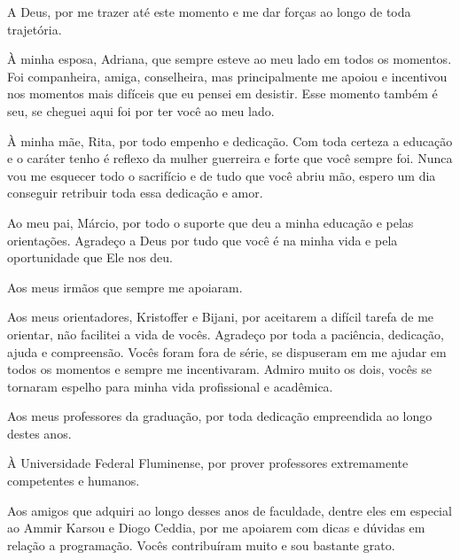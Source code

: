 \begin{agradecimentos}
A Deus, por me trazer até este momento e me dar forças ao longo de toda trajetória.

À minha esposa, Adriana, que sempre esteve ao meu lado em todos os momentos. Foi companheira, amiga, conselheira, mas principalmente me apoiou e incentivou nos momentos mais difíceis que eu pensei em desistir. Esse momento também é seu, se cheguei aqui foi por ter você ao meu lado.

À minha mãe, Rita, por todo empenho e dedicação. Com toda certeza a educação e o caráter tenho é reflexo da mulher guerreira e forte que você sempre foi. Nunca vou me esquecer todo o sacrifício e de tudo que você abriu mão, espero um dia conseguir retribuir toda essa dedicação e amor.

Ao meu pai, Márcio, por todo o suporte que deu a minha educação e pelas orientações. Agradeço a Deus por tudo que você é na minha vida e pela oportunidade que Ele nos deu. 

Aos meus irmãos que sempre me apoiaram.

Aos meus orientadores, Kristoffer e Bijani, por aceitarem a difícil tarefa de me orientar, não facilitei a vida de vocês. Agradeço por toda a paciência, dedicação, ajuda e compreensão. Vocês foram fora de série, se dispuseram em me ajudar em todos os momentos e sempre me incentivaram. Admiro muito os dois, vocês se tornaram espelho para minha vida profissional e acadêmica.

Aos meus professores da graduação, por toda dedicação empreendida ao longo destes anos.

À Universidade Federal Fluminense, por prover professores extremamente competentes e humanos. 

Aos amigos que adquiri ao longo desses anos de faculdade, dentre eles em especial ao Ammir Karsou e Diogo Ceddia, por me apoiarem com dicas e dúvidas em relação a programação. Vocês contribuíram muito e sou bastante grato.
\end{agradecimentos}